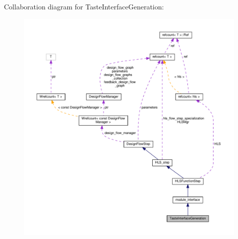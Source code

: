 Collaboration diagram for Taste\+Interface\+Generation\+:
\nopagebreak
\begin{figure}[H]
\begin{center}
\leavevmode
\includegraphics[width=350pt]{da/dd0/classTasteInterfaceGeneration__coll__graph}
\end{center}
\end{figure}
